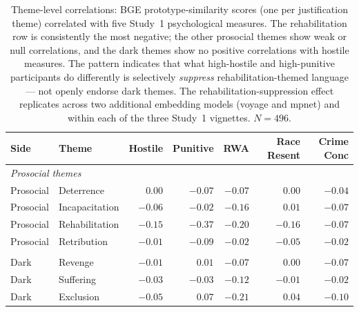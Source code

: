 \begin{table}[htbp]
  \centering
  \caption{Theme-level correlations: BGE prototype-similarity scores (one per justification theme) correlated with five Study~1 psychological measures. The rehabilitation row is consistently the most negative; the other prosocial themes show weak or null correlations, and the dark themes show no positive correlations with hostile measures. The pattern indicates that what high-hostile and high-punitive participants do differently is selectively \textit{suppress} rehabilitation-themed language --- not openly endorse dark themes. The rehabilitation-suppression effect replicates across two additional embedding models (voyage and mpnet) and within each of the three Study~1 vignettes. $N = 496$.}
  \label{tab:nlp_theme_correlations}
  \small
  \begin{tabular}{llrrrrr}
    \toprule
    Side & Theme & Hostile & Punitive & RWA & Race Resent & Crime Conc \\
    \midrule
    \multicolumn{7}{l}{\textit{Prosocial themes}} \\
    Prosocial & Deterrence       & $\phantom{-}0.00$ & $-0.07$ & $-0.07$ & $\phantom{-}0.00$ & $-0.04$ \\
    Prosocial & Incapacitation   & $-0.06$           & $-0.02$ & $-0.16$ & $\phantom{-}0.01$ & $-0.07$ \\
    Prosocial & Rehabilitation   & $-0.15$           & $-0.37$ & $-0.20$ & $-0.16$           & $-0.07$ \\
    Prosocial & Retribution      & $-0.01$           & $-0.09$ & $-0.02$ & $-0.05$           & $-0.02$ \\
    \addlinespace
    \multicolumn{7}{l}{\textit{Dark themes}} \\
    Dark      & Revenge          & $-0.01$           & $\phantom{-}0.01$ & $-0.07$ & $\phantom{-}0.00$ & $-0.07$ \\
    Dark      & Suffering        & $-0.03$           & $-0.03$           & $-0.12$ & $-0.01$           & $-0.02$ \\
    Dark      & Exclusion        & $-0.05$           & $\phantom{-}0.07$ & $-0.21$ & $\phantom{-}0.04$ & $-0.10$ \\
    \bottomrule
  \end{tabular}
\end{table}
